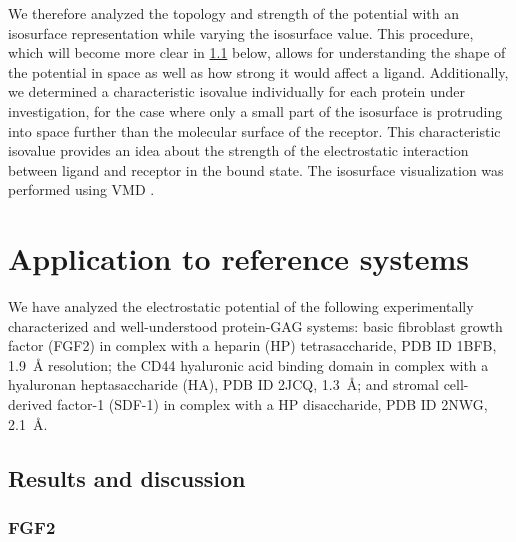 We therefore analyzed the topology and strength of the potential with an
isosurface representation while varying the isosurface value. This procedure,
which will become more clear in \cref{bspred:appl_discussion} below, allows for
understanding the shape of the potential in space as well as how strong it would
affect a ligand. Additionally, we determined a characteristic isovalue
individually for each protein under investigation, for the case where only a
small part of the isosurface is protruding into space further than the molecular
surface of the receptor. This characteristic isovalue provides an idea about the
strength of the electrostatic interaction between ligand and receptor in the
bound state. The isosurface visualization was performed using VMD
\cite{vmd_1996}.


\section{Application to reference systems}
\label{bspred:application}

We have analyzed the electrostatic potential of the following experimentally
characterized and well-understood protein-GAG systems: basic fibroblast growth
factor (FGF2) in complex with a heparin (HP) tetrasaccharide, PDB ID 1BFB,
\SI{1.9}{\angstrom} resolution; the CD44 hyaluronic acid binding domain in
complex with a hyaluronan heptasaccharide (HA), PDB ID 2JCQ,
\SI{1.3}{\angstrom}; and stromal cell-derived factor-1 (SDF-1) in complex with a
HP disaccharide, PDB ID 2NWG, \SI{2.1}{\angstrom}.



\subsection{Results and discussion}
\label{bspred:appl_discussion}

\subsubsection{FGF2}

